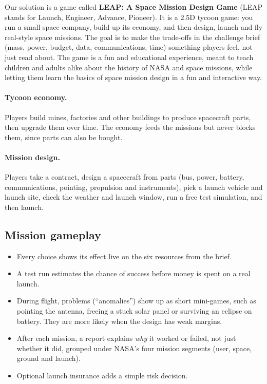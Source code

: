 \documentclass[11pt,a4paper]{article}
\begin{document}
Our solution is a game called \textbf{LEAP: A Space Mission Design Game} (LEAP stands for Launch, Engineer, Advance,
Pioneer). It is a 2.5D tycoon game: you run a small space company, build up its economy, and then design, launch and
fly real-style space missions. The goal is to make the trade-offs in the challenge brief (mass, power, budget, data,
communications, time) something players feel, not just read about. The game is a fun and educational experience,
meant to teach children and adults alike about the history of NASA and space missions, while letting them learn the
basics of space mission design in a fun and interactive way.



\paragraph{Tycoon economy.} Players build mines, factories and other buildings to produce spacecraft parts, then
upgrade them over time. The economy feeds the missions but never blocks them, since parts can also be bought.

\paragraph{Mission design.} Players take a contract, design a spacecraft from parts (bus, power, battery,
communications, pointing, propulsion and instruments), pick a launch vehicle and launch site, check the weather and
launch window, run a free test simulation, and then launch.

\subsection{Mission gameplay}
\begin{itemize}
  \item Every choice shows its effect live on the six resources from the brief.
  \item A test run estimates the chance of success before money is spent on a real launch.
  \item During flight, problems (``anomalies'') show up as short mini-games, such as pointing the antenna, freeing a
        stuck solar panel or surviving an eclipse on battery. They are more likely when the design has weak margins.
  \item After each mission, a report explains \emph{why} it worked or failed, not just whether it did, grouped under
        NASA's four mission segments (user, space, ground and launch).
  \item Optional launch insurance adds a simple risk decision.
\end{itemize}
\end{document}
